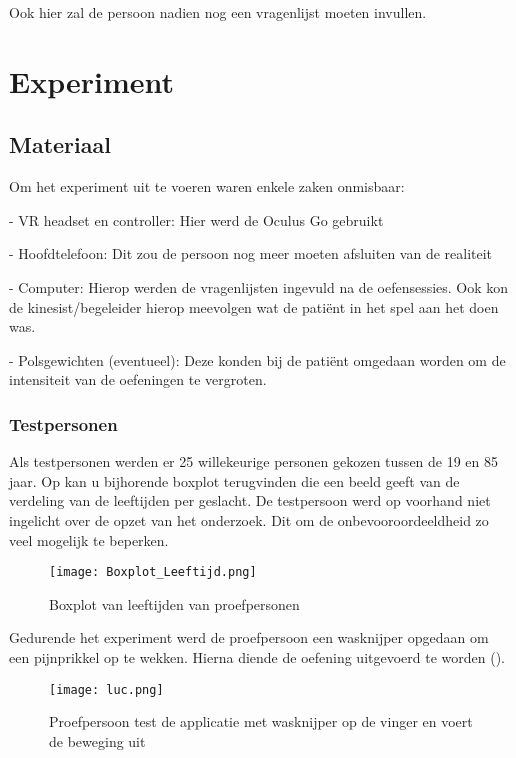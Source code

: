 Ook hier zal de persoon nadien nog een vragenlijst moeten invullen.

\chapter{Experiment}

\section{Materiaal}
Om het experiment uit te voeren waren enkele zaken onmisbaar:

- VR headset en controller: Hier werd de Oculus Go gebruikt

- Hoofdtelefoon: Dit zou de persoon nog meer moeten afsluiten van de realiteit

- Computer: Hierop werden de vragenlijsten ingevuld na de oefensessies. Ook kon de kinesist/begeleider hierop meevolgen wat de patiënt in het spel aan het doen was.

- Polsgewichten (eventueel): Deze konden bij de patiënt omgedaan worden om de intensiteit van de oefeningen te vergroten.

\newpage
\subsection{Testpersonen}
Als testpersonen werden er 25 willekeurige personen gekozen tussen de 19 en 85 jaar. Op \cite{figuur 6.1} kan u bijhorende boxplot terugvinden die een beeld geeft van de verdeling van de leeftijden per geslacht. De testpersoon werd op voorhand niet ingelicht over de opzet van het onderzoek. Dit om de onbevooroordeeldheid zo veel mogelijk te beperken.

\begin{figure}[h]
    \centering
    \texttt{[image: Boxplot\_Leeftijd.png]}
    \caption{Boxplot van leeftijden van proefpersonen}
\end{figure}

Gedurende het experiment werd de proefpersoon een wasknijper opgedaan om een pijnprikkel op te wekken. Hierna diende de oefening uitgevoerd te worden (\cite{figuur 6.2}).

\begin{figure}[h]
    \centering
    \texttt{[image: luc.png]}
    \caption{Proefpersoon test de applicatie met wasknijper op de vinger en voert de beweging uit}
\end{figure}

\newpage

